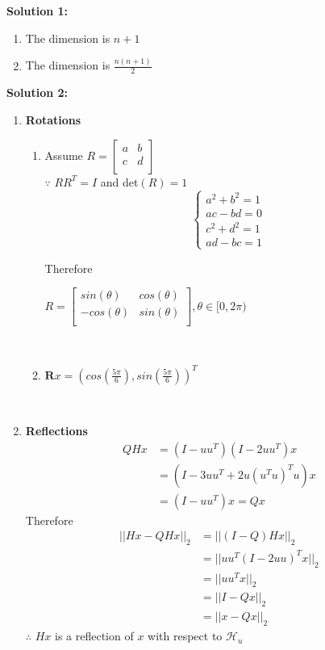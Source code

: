 \documentclass[english,onecolumn,UTF8]{IEEEtran}
\begin{document}
\textbf{Solution 1:}
\begin{enumerate}
	\item
		The dimension is $n+1$
	\item
	 	The dimension is $\frac{n(n+1)}{2}$
\end{enumerate}

\textbf{Solution 2:}
\begin{enumerate}
	\item \textbf{Rotations}\\
	\begin{enumerate}
		\item 
		Assume 
		$R=
		\begin{bmatrix}
		a & b \\
		c & d \\
		\end{bmatrix}
		$\\
		$\because$ $RR^{T}=I$ and det$(R)=1$\\
		\[ \left \{
		\begin{array}{l}
			a^{2}+b^{2}=1\\
			ac-bd=0\\
			c^{2}+d^{2}=1\\
			ad-bc=1
		\end{array}
		 \right.\]
		
	Therefore\\
		\begin{center}
		$R=\begin{bmatrix}
		sin(\theta) & cos(\theta)\\
		-cos(\theta) & sin(\theta)\\
		\end{bmatrix}
		,\theta \in [0,2\pi)
		$		
		\end{center}
~\\	
	\item
		$\textbf{R}x=(cos(\frac{5\pi}{6}),sin(\frac{5\pi}{6}))^T$
	\end{enumerate}
	~\\
	\item\textbf{Reflections}
	\begin{align*}
		QHx
		&=(I-uu^{T})(I-2uu^{T})x\\
		&=(I-3uu^{T}+2u(u^{T}u)^{T}u)x\\
		&=(I-uu^{T})x=Qx
	\end{align*}
	Therefore
	\begin{align*}
		||Hx-QHx||_{2}
		&=||(I-Q)Hx||_{2}\\
		&=||uu^{T}(I-2uu)^{T}x||_{2}\\
		&=||uu^{T}x||_{2}\\
		&=||I-Qx||_{2}\\
		&=||x-Qx||_{2}
	\end{align*}
	$\therefore$ $Hx$ is a reflection of $x$ with respect to $\mathcal{H}_{u}$
	
\end{enumerate}
\end{document}
